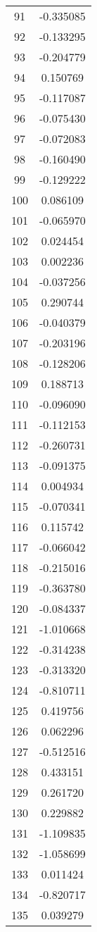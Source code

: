 \documentclass[12pt]{article}
\begin{document}
\begin{longtable}{@{}cc@{}}
91 & -0.335085 \\
92 & -0.133295 \\
93 & -0.204779 \\
94 & 0.150769 \\
95 & -0.117087 \\
96 & -0.075430 \\
97 & -0.072083 \\
98 & -0.160490 \\
99 & -0.129222 \\
100 & 0.086109 \\
101 & -0.065970 \\
102 & 0.024454 \\
103 & 0.002236 \\
104 & -0.037256 \\
105 & 0.290744 \\
106 & -0.040379 \\
107 & -0.203196 \\
108 & -0.128206 \\
109 & 0.188713 \\
110 & -0.096090 \\
111 & -0.112153 \\
112 & -0.260731 \\
113 & -0.091375 \\
114 & 0.004934 \\
115 & -0.070341 \\
116 & 0.115742 \\
117 & -0.066042 \\
118 & -0.215016 \\
119 & -0.363780 \\
120 & -0.084337 \\
121 & -1.010668 \\
122 & -0.314238 \\
123 & -0.313320 \\
124 & -0.810711 \\
125 & 0.419756 \\
126 & 0.062296 \\
127 & -0.512516 \\
128 & 0.433151 \\
129 & 0.261720 \\
130 & 0.229882 \\
131 & -1.109835 \\
132 & -1.058699 \\
133 & 0.011424 \\
134 & -0.820717 \\
135 & 0.039279 \\

\end{longtable}
\end{document}
